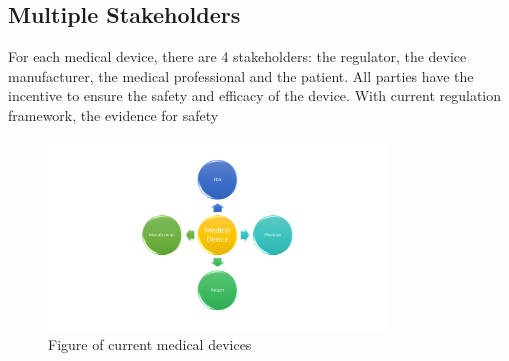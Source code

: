 \subsection{Multiple Stakeholders}
For each medical device, there are 4 stakeholders: the regulator, the device manufacturer, the medical professional and the patient. All parties have the incentive to ensure the safety and efficacy of the device. With current regulation framework, the evidence for safety 
\begin{figure}[t]
		\centering
		\includegraphics[width=0.8\textwidth]{figs/stakeholders.pdf}
		\caption{\small Figure of current medical devices}
		\label{fig:Cur}
\end{figure}

